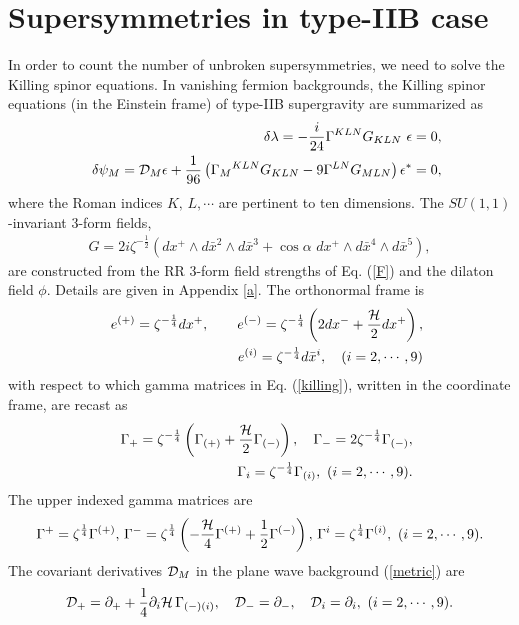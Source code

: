 \documentclass[a4paper,12pt]{article}
\begin{document}
\section{Supersymmetries in type-IIB case}\label{iii}

In order to count the number of unbroken supersymmetries, we need to solve the Killing spinor equations.
In vanishing fermion backgrounds, the Killing spinor equations (in the Einstein frame) of type-IIB supergravity are summarized as \cite{schwarz}
\begin{eqnarray}\label{killing}
&&\delta\lambda=-\frac{i}{24}\Gamma^{KLN}G_{KLN}\,\,\epsilon=0,\nonumber\\
&&\delta\psi_M={\cal D}_M\epsilon+\frac{1}{96}\left(\Gamma_M{}^{KLN}G_{KLN}-9\Gamma^{LN}G_{MLN}\right)\epsilon^*=0,
\end{eqnarray}
where the Roman indices $K,\,L,\cdots$ are pertinent to ten dimensions. The $SU(1,1)$-invariant 3-form fields,
\begin{eqnarray}
G=2i\zeta^{-\frac{1}{2}}\left(dx^+\wedge d\bar{x}^2 \wedge d\bar{x}^3+\cos{\alpha}\,\,dx^+\wedge d\bar{x}^4 \wedge d\bar{x}^5\right),
\end{eqnarray}
are constructed from the RR 3-form field strengths of Eq. (\ref{F}) and the dilaton field $\phi$. Details are given in Appendix \ref{a}.
The orthonormal frame is  
\begin{eqnarray}
&&e^{(+)}=\zeta^{-\frac{1}{4}}dx^+, \qquad e^{(-)}=\zeta^{-\frac{1}{4}}\left(2dx^-+\frac{{\cal H}}{2}dx^+\right),\nonumber\\
&&e^{(i)}=\zeta^{-\frac{1}{4}}d\bar{x}^i,\quad (i=2,\cdots,9)
\end{eqnarray}
with respect to which gamma matrices in Eq. (\ref{killing}), written in the coordinate frame, are recast as
\begin{eqnarray}\label{gdown}
&&\Gamma_+=\zeta^{-\frac{1}{4}}\left(\Gamma_{(+)}+\frac{{\cal H}}{2}\Gamma_{(-)}\right),\quad
\Gamma_-=2\zeta^{-\frac{1}{4}}\Gamma_{(-)},\nonumber\\
&&\Gamma_{i}=\zeta^{-\frac{1}{4}}\Gamma_{(i)},\,\,(i=2,\cdots, 9).
\end{eqnarray}
The upper indexed gamma matrices are
\begin{eqnarray}\label{gup}
\Gamma^+=\zeta^{\frac{1}{4}}\Gamma^{(+)}, \,
\Gamma^-=\zeta^{\frac{1}{4}}\left(-\frac{{\cal H}}{4}\Gamma^{(+)}+\frac{1}{2}\Gamma^{(-)}\right), \, \Gamma^i=\zeta^{\frac{1}{4}}\Gamma^{(i)}, \,\,(i=2,\cdots, 9).
\end{eqnarray}
The covariant derivatives ${\cal D}_M$ in the plane wave background (\ref{metric}) are
\begin{eqnarray}
{\cal D}_+=\partial_++\frac{1}{4}\partial_i {\cal H}\,\Gamma_{(-)(i)}, \quad{\cal D}_-=\partial_-, \quad{\cal D}_i=\partial_i, \,\,(i=2,\cdots, 9).
\end{eqnarray}
\end{document}
